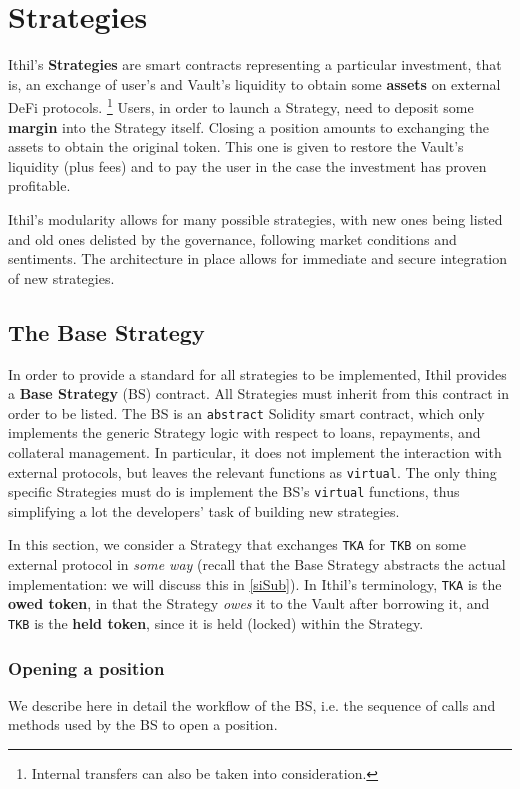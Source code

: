 \documentclass[a4paper,10 pt]{article}
\theoremstyle{definition}
\begin{document}
\section{Strategies}\label{stratSec}

Ithil's {\bf Strategies} are smart contracts representing a particular investment, that is, an exchange of user's and Vault's liquidity to obtain some {\bf assets} on external DeFi protocols. \footnote{Internal transfers can also be taken into consideration.} Users, in order to launch a Strategy, need to deposit some {\bf margin} into the Strategy itself. Closing a position amounts to exchanging the assets to obtain the original token. This one is given to restore the Vault's liquidity (plus fees) and to pay the user in the case the investment has proven profitable. 

Ithil's modularity allows for many possible strategies, with new ones being listed and old ones delisted by the governance, following market conditions and sentiments. The architecture in place allows for immediate and secure integration of new strategies.

\subsection{The Base Strategy}\label{asSub}

In order to provide a standard for all strategies to be implemented, Ithil provides a {\bf Base Strategy} (BS) contract. All Strategies must inherit from this contract in order to be listed. The BS is an \verb|abstract| Solidity smart contract, which only implements the generic Strategy logic with respect to loans, repayments, and collateral management. In particular, it does not implement the interaction with external protocols, but leaves the relevant functions as \verb|virtual|. The only thing specific Strategies must do is implement the BS's \verb|virtual| functions, thus simplifying a lot the developers' task of building new strategies.

 In this section, we consider a Strategy that exchanges \verb|TKA| for \verb|TKB| on some external protocol in {\it some way} (recall that the Base Strategy abstracts the actual implementation: we will discuss this in \ref{siSub}). In Ithil's terminology, \verb|TKA| is the {\bf owed token}, in that the Strategy {\it owes} it to the Vault after borrowing it, and \verb|TKB| is the {\bf held token}, since it is held (locked) within the Strategy.

\subsubsection{Opening a position}\label{opSubSub}
We describe here in detail the workflow of the BS, i.e. the sequence of calls and methods used by the BS to open a position.
\end{document}

